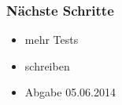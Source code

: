 \documentclass[]{beamer}
\begin{document}
\begin{frame}
	\frametitle{Nächste Schritte}
	\begin{itemize}
		\item mehr Tests
		\item schreiben
		\item Abgabe 05.06.2014
	\end{itemize}
\end{frame}
\end{document}
